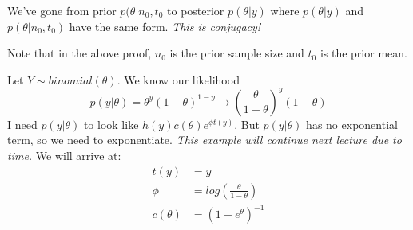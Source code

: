 \documentclass[titlepage, 12pt, leqno]{article}
\begin{document}
We've gone from prior $p(\theta|n_{0}, t_{0}$ to posterior $p(\theta|y)$ where
$p(\theta|y)$ and $p(\theta|n_{0},t_{0})$ have the same form. \textit{This is
conjugacy!}

\begin{note}
    Note that in the above proof, $n_{0}$ is the prior sample size and $t_{0}$ is
    the prior mean.
\end{note}

\begin{ex}
    Let $Y \sim binomial(\theta)$. We know our likelihood
    \[
        p(y|\theta) = \theta^{y}(1-\theta)^{1-y} \rightarrow \left(
            \frac{\theta}{1-\theta}\right)^{y}(1-\theta)
    \]
    I need $p(y|\theta)$ to look like $h(y)c(\theta)e^{\phi t(y)}$. But $p(y|
    \theta)$ has no exponential term, so we need to exponentiate. \textit{This
    example will continue next lecture due to time.} We will arrive at:
    \begin{align*}
        t(y) &= y \\
        \phi &= log\left(\frac{\theta}{1-\theta}\right)\\
        c(\theta) &= (1 + e^{\theta})^{-1}
    \end{align*}
\end{ex}
\end{document}

